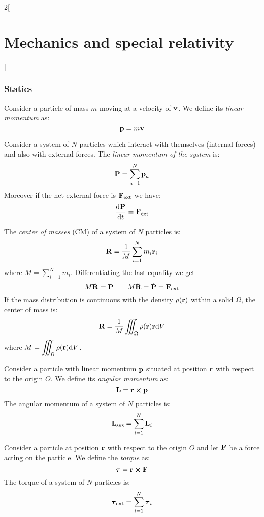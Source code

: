 \documentclass[../../../main.tex]{subfiles}
\begin{document}
\begin{multicols}{2}[\section{Mechanics and special relativity}]
  \subsubsection{Statics}
  \begin{definition}
    Consider a particle of mass $m$ moving at a velocity of $\boldsymbol{\mathrm{v}}$. We define its \textit{linear momentum} as:
    $$\boldsymbol{\mathrm{p}}=m\boldsymbol{\mathrm{v}}$$
  \end{definition}
  \begin{prop}
    Consider a system of $N$ particles which interact with themselves (internal forces) and also with external forces. The \textit{linear momentum of the system} is: $$\boldsymbol{\mathrm{P}}=\sum_{a=1}^N\boldsymbol{\mathrm{p}}_a$$ Moreover if the net external force is $\boldsymbol{\mathrm{F}}_\text{ext}$ we have:
    $$\dv{\boldsymbol{\mathrm{P}}}{t}=\boldsymbol{\mathrm{F}}_\text{ext}$$
  \end{prop}
  \begin{prop}
    The \textit{center of masses} (CM) of a system of $N$ particles is: $$\boldsymbol{\mathrm{R}}=\frac{1}{M}\sum_{i=1}^Nm_i\boldsymbol{\mathrm{r}}_i$$ where $\displaystyle M=\sum_{i=1}^Nm_i$. Differentiating the last equality we get
    $$M\dot{\boldsymbol{\mathrm{R}}}=\boldsymbol{\mathrm{P}}\qquad M\ddot{\boldsymbol{\mathrm{R}}}=\dot{\boldsymbol{\mathrm{P}}}=\boldsymbol{\mathrm{F}}_\text{ext}$$
    If the mass distribution is continuous with the density $\rho(\boldsymbol{\mathrm{r}})$ within a solid $\Omega$, the center of mass is: $$\boldsymbol{\mathrm{R}}=\frac{1}{M}\iiint_\Omega\rho(\boldsymbol{\mathrm{r}})\boldsymbol{\mathrm{r}}\dd V$$ where $\displaystyle M=\iiint_\Omega\rho(\boldsymbol{\mathrm{r}})\dd V$.
  \end{prop}
  \begin{prop}
    Consider a particle with linear momentum $\boldsymbol{\mathrm{p}}$ situated at position $\boldsymbol{\mathrm{r}}$ with respect to the origin $O$. We define its \textit{angular momentum} as: $$\vectorfunction{L}=\vectorfunction{r}\crossprod\vectorfunction{p}$$ The angular momentum of a system of $N$ particles is: $$\boldsymbol{\mathrm{L}}_\text{sys}=\sum_{i=1}^N\boldsymbol{\mathrm{L}}_i$$
  \end{prop}
  \begin{prop}[Torque]
    Consider a particle at position $\boldsymbol{\mathrm{r}}$ with respect to the origin $O$ and let $\boldsymbol{\mathrm{F}}$ be a force acting on the particle. We define the \textit{torque} as: $$\vectorfunction{\tau}=\vectorfunction{r}\crossprod\vectorfunction{F}$$ The torque of a system of $N$ particles is: $$\boldsymbol{\mathrm{\tau}}_\text{ext}=\sum_{i=1}^N\boldsymbol{\mathrm{\tau}}_i$$

\end{prop}
\end{multicols}
\end{document}
